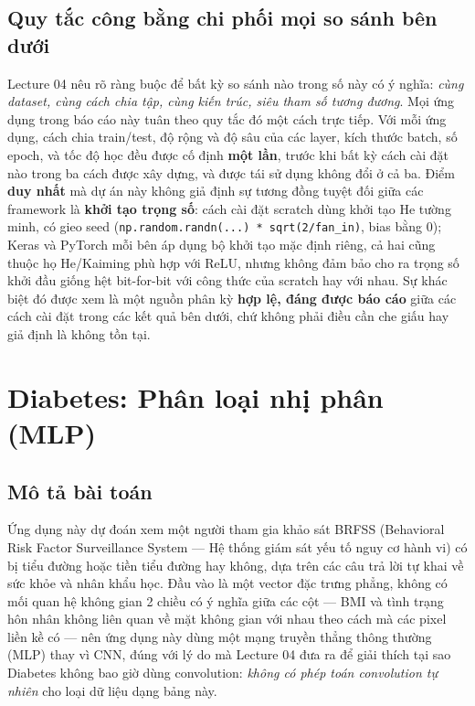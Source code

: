 \documentclass[11pt]{article}
\newcommand{\code}[1]{\texttt{#1}}
\begin{document}
\subsection{Quy tắc công bằng chi phối mọi so sánh bên dưới}

Lecture 04 nêu rõ ràng buộc để bất kỳ so sánh nào trong số này có ý nghĩa:
\textit{cùng dataset, cùng cách chia tập, cùng kiến trúc, siêu tham số
tương đương}. Mọi ứng dụng trong báo cáo này tuân theo quy tắc đó một cách
trực tiếp. Với mỗi ứng dụng, cách chia train/test, độ rộng và độ sâu của
các layer, kích thước batch, số epoch, và tốc độ học đều được cố định
\textbf{một lần}, trước khi bất kỳ cách cài đặt nào trong ba cách được xây
dựng, và được tái sử dụng không đổi ở cả ba. Điểm \textbf{duy nhất} mà dự
án này không giả định sự tương đồng tuyệt đối giữa các framework là
\textbf{khởi tạo trọng số}: cách cài đặt scratch dùng khởi tạo He tường
minh, có gieo seed (\code{np.random.randn(...) * sqrt(2/fan\_in)}, bias
bằng 0); Keras và PyTorch mỗi bên áp dụng bộ khởi tạo mặc định riêng, cả
hai cũng thuộc họ He/Kaiming phù hợp với ReLU, nhưng không đảm bảo cho ra
trọng số khởi đầu giống hệt bit-for-bit với công thức của scratch hay với
nhau. Sự khác biệt đó được xem là một nguồn phân kỳ \textbf{hợp lệ, đáng
được báo cáo} giữa các cách cài đặt trong các kết quả bên dưới, chứ không
phải điều cần che giấu hay giả định là không tồn tại.

\newpage
\section{Diabetes: Phân loại nhị phân (MLP)}
\label{sec:diabetes}

\subsection{Mô tả bài toán}

Ứng dụng này dự đoán xem một người tham gia khảo sát BRFSS (Behavioral Risk
Factor Surveillance System — Hệ thống giám sát yếu tố nguy cơ hành vi) có
bị tiểu đường hoặc tiền tiểu đường hay không, dựa trên các câu trả lời tự
khai về sức khỏe và nhân khẩu học. Đầu vào là một vector đặc trưng phẳng,
không có mối quan hệ không gian 2 chiều có ý nghĩa giữa các cột — BMI và
tình trạng hôn nhân không liên quan về mặt không gian với nhau theo cách mà
các pixel liền kề có — nên ứng dụng này dùng một mạng truyền thẳng thông
thường (MLP) thay vì CNN, đúng với lý do mà Lecture 04 đưa ra để giải thích
tại sao Diabetes không bao giờ dùng convolution: \textit{không có phép toán
convolution tự nhiên} cho loại dữ liệu dạng bảng này.
\end{document}
